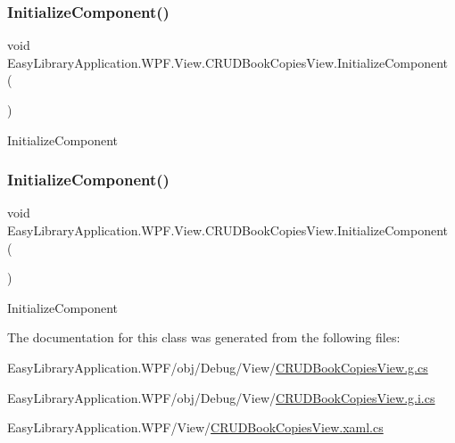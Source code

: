 \subsubsection{\texorpdfstring{Initialize\+Component()}{InitializeComponent()}\hspace{0.1cm}{\footnotesize\ttfamily [1/2]}}
{\footnotesize\ttfamily void Easy\+Library\+Application.\+W\+P\+F.\+View.\+C\+R\+U\+D\+Book\+Copies\+View.\+Initialize\+Component (\begin{DoxyParamCaption}{ }\end{DoxyParamCaption})}



Initialize\+Component 

\mbox{\label{class_easy_library_application_1_1_w_p_f_1_1_view_1_1_c_r_u_d_book_copies_view_aba4ee0c105f80387d4930984c400b7b0}} 
\subsubsection{\texorpdfstring{Initialize\+Component()}{InitializeComponent()}\hspace{0.1cm}{\footnotesize\ttfamily [2/2]}}
{\footnotesize\ttfamily void Easy\+Library\+Application.\+W\+P\+F.\+View.\+C\+R\+U\+D\+Book\+Copies\+View.\+Initialize\+Component (\begin{DoxyParamCaption}{ }\end{DoxyParamCaption})}



Initialize\+Component 



The documentation for this class was generated from the following files\+:\begin{DoxyCompactItemize}
\item 
Easy\+Library\+Application.\+W\+P\+F/obj/\+Debug/\+View/\mbox{\hyperlink{_c_r_u_d_book_copies_view_8g_8cs}{C\+R\+U\+D\+Book\+Copies\+View.\+g.\+cs}}\item 
Easy\+Library\+Application.\+W\+P\+F/obj/\+Debug/\+View/\mbox{\hyperlink{_c_r_u_d_book_copies_view_8g_8i_8cs}{C\+R\+U\+D\+Book\+Copies\+View.\+g.\+i.\+cs}}\item 
Easy\+Library\+Application.\+W\+P\+F/\+View/\mbox{\hyperlink{_c_r_u_d_book_copies_view_8xaml_8cs}{C\+R\+U\+D\+Book\+Copies\+View.\+xaml.\+cs}}\end{DoxyCompactItemize}
